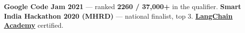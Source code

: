 \begin{zitemize}
    \item \textbf{Google Code Jam 2021} --- ranked \textbf{2260 / 37,000+} in the qualifier. \textbf{Smart India Hackathon 2020 (MHRD)} --- national finalist, top 3. \href{https://academy.langchain.com/certificates/vkkkoij3ke}{\textbf{LangChain Academy}} certified.
\end{zitemize}

